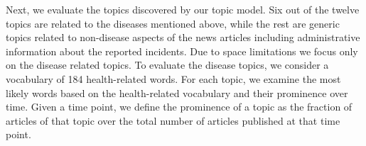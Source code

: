 \documentclass[conference]{IEEEtran}
\begin{document}

Next, we evaluate the topics discovered by our topic model. Six out of the twelve topics are related to the diseases mentioned above, while the rest are generic topics related to non-disease aspects of the news articles including administrative information about the reported incidents. Due to space limitations we focus only on the disease related topics. To evaluate the disease topics, we consider a vocabulary of 184 health-related words. For each topic, we examine the most likely words based on the health-related vocabulary and their prominence over time. Given a time point, we define the prominence of a topic as the fraction of articles of that topic over the total number of articles published at that time point.
\end{document}
